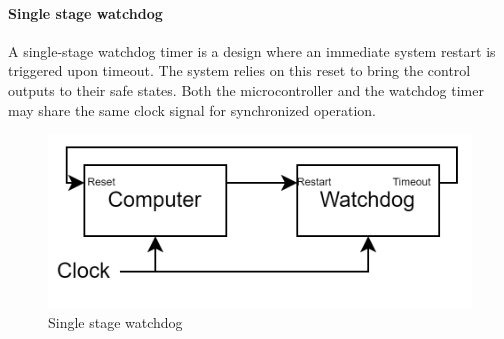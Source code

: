 \paragraph*{Single stage watchdog}
A single-stage watchdog timer is a design where an immediate system restart is triggered upon timeout. 
The system relies on this reset to bring the control outputs to their safe states.
Both the microcontroller and the watchdog timer may share the same clock signal for synchronized operation.
\begin{figure}[H]
    \centering
    \includegraphics[width=0.5\linewidth]{images/swdog.png}
    \caption{Single stage watchdog}
\end{figure}

